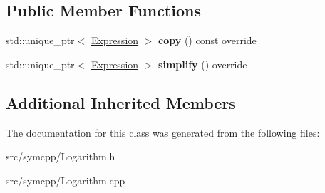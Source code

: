 \subsection*{Public Member Functions}
\begin{DoxyCompactItemize}
\item 
std\+::unique\+\_\+ptr$<$ \hyperlink{classExpression}{Expression} $>$ {\bfseries copy} () const override\hypertarget{classLogarithm_ac3ec6915c2659bb30d03e90579bb5a5d}{}\label{classLogarithm_ac3ec6915c2659bb30d03e90579bb5a5d}

\item 
std\+::unique\+\_\+ptr$<$ \hyperlink{classExpression}{Expression} $>$ {\bfseries simplify} () override\hypertarget{classLogarithm_a79592110778c546fd66e3811eafd0681}{}\label{classLogarithm_a79592110778c546fd66e3811eafd0681}

\end{DoxyCompactItemize}
\subsection*{Additional Inherited Members}


The documentation for this class was generated from the following files\+:\begin{DoxyCompactItemize}
\item 
src/symcpp/Logarithm.\+h\item 
src/symcpp/Logarithm.\+cpp\end{DoxyCompactItemize}
